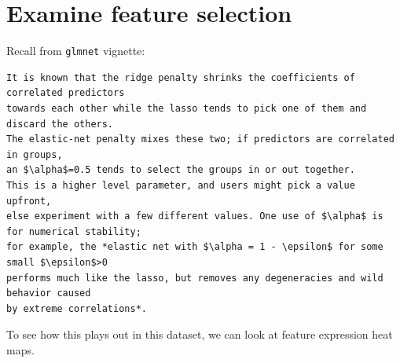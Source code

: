 \documentclass[
]{book}
\begin{document}
\hypertarget{examine-feature-selection}{%
\section{Examine feature selection}\label{examine-feature-selection}}

Recall from \texttt{glmnet} vignette:

\begin{verbatim}
It is known that the ridge penalty shrinks the coefficients of correlated predictors
towards each other while the lasso tends to pick one of them and discard the others.
The elastic-net penalty mixes these two; if predictors are correlated in groups,
an $\alpha$=0.5 tends to select the groups in or out together.
This is a higher level parameter, and users might pick a value upfront,
else experiment with a few different values. One use of $\alpha$ is for numerical stability;
for example, the *elastic net with $\alpha = 1 - \epsilon$ for some small $\epsilon$>0
performs much like the lasso, but removes any degeneracies and wild behavior caused
by extreme correlations*.
\end{verbatim}

To see how this plays out in this dataset, we can look at feature expression
heat maps.
\end{document}

